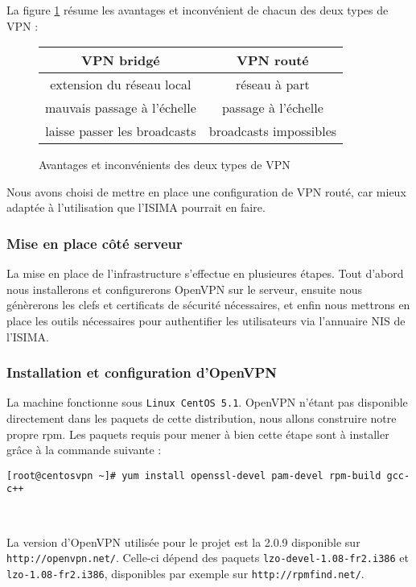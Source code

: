 La figure \ref{tableau_types_vpn} résume les avantages et inconvénient de chacun des deux types de VPN :
\begin{figure}[H]
	\begin{center}
		\begin{tabular}{c|c}
			VPN bridgé & VPN routé \\
			\hline
			extension du réseau local & réseau à part \\
			mauvais passage à l'échelle & passage à l'échelle \\
			laisse passer les broadcasts & broadcasts impossibles \\
		\end{tabular}
	\end{center}
	\caption{Avantages et inconvénients des deux types de VPN}
	\label{tableau_types_vpn}
\end{figure}

Nous avons choisi de mettre en place une configuration de VPN routé, car mieux adaptée à l'utilisation que l'ISIMA pourrait en faire.

\subsubsection{Mise en place côté serveur}

La mise en place de l'infrastructure s'effectue en plusieures étapes. Tout d'abord nous installerons et configurerons OpenVPN sur le serveur, ensuite nous génèrerons les clefs et certificats de sécurité nécessaires, et enfin nous mettrons en place les outils nécessaires pour authentifier les utilisateurs via l'annuaire NIS de l'ISIMA.

\subsubsection{Installation et configuration d'OpenVPN}

La machine fonctionne sous \texttt{Linux CentOS 5.1}. OpenVPN n'étant pas disponible directement dans les paquets de cette distribution, nous allons construire notre propre rpm. Les paquets requis pour mener à bien cette étape sont à installer grâce à la commande suivante :

\verb|[root@centosvpn ~]# yum install openssl-devel pam-devel rpm-build gcc-c++|

~

La version d'OpenVPN utilisée pour le projet est la 2.0.9 disponible sur \verb|http://openvpn.net/|. Celle-ci dépend des paquets \verb|lzo-devel-1.08-fr2.i386| et \verb|lzo-1.08-fr2.i386|, disponibles par exemple sur \verb|http://rpmfind.net/|.

